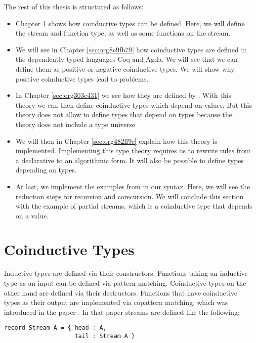 \documentclass[a4paper,cleardoubleempty,BCOR1cm]{scrbook}
\begin{document}
The rest of this thesis is structured as follows:

\begin{itemize}
\item Chapter \ref{sec:org764730a} shows how coinductive types can be defined.
Here, we will define the stream and function type, as well as some
functions on the stream.

\item We will see in Chapter \ref{sec:org8c9fb79} how
coinductive types are defined in the dependently typed languages Coq and
Agda. We will see that we can define them as positive or negative
coinductive types. We will show why positive coinductive types lead to
problems.

\item In Chapter \ref{sec:org303c431} we
see how they are defined by \cite{basold2016type}. With this theory we can
then define coinductive types which depend on values. But this theory does
not allow to define types that depend on types because the theory does not
include a type universe

\item We will then in Chapter \ref{sec:org482ff9e} explain how this theory is
implemented. Implementing this type theory requires us to rewrite rules from
a declarative to an algorithmic form. It will also be possible to define
types depending on types.

\item At last, we implement the examples from \cite{basold2016type} in our syntax.
Here, we will see the reduction steps for recursion and corecursion. We will
conclude this section with the example of partial streams, which is a
coinductive type that depends on a value.
\end{itemize}

\chapter{Coinductive Types}
\label{sec:org764730a}
Inductive types are defined via their constructors. Functions taking an
inductive type as an input can be defined via pattern-matching. Coinductive
types on the other hand are defined via their destructors. Functions that
have coinductive types as their output are implemented via copattern matching,
which was introduced in the paper \cite{abel2013copatterns}. In that paper
streams are defined like the following:

\begin{lstlisting}
record Stream A = { head : A,
                    tail : Stream A }
\end{lstlisting}
\end{document}
